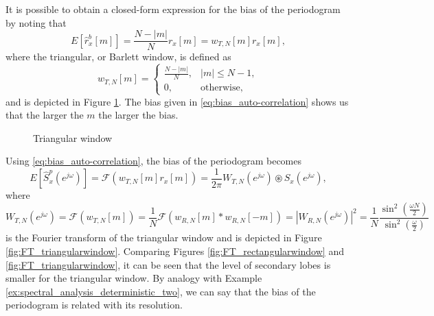 It is possible to obtain a closed-form expression for the bias of the periodogram by noting that
\begin{equation}
\label{eq:bias_auto-correlation}
E\left[\hat{r}_{x}^{b}[m]\right]  = \frac{N - |m|}{N} r_{x}[m] = w_{T,N}[m] r_{x}[m],
\end{equation}
where the triangular, or Barlett window, is defined as
\begin{equation}
w_{T,N}[m] = \begin{cases} \frac{N - |m|}{N}, & |m| \leq N-1, \\
0, & \text{otherwise},
\end{cases}
\end{equation}
and is depicted in Figure \ref{fig:triangularwindow}. The bias given in \eqref{eq:bias_auto-correlation} shows us that the larger the $m$ the larger the bias.
\begin{figure}
	\begin{center}
	\end{center}
	\caption{Triangular window}
	\label{fig:triangularwindow}
\end{figure}


Using \eqref{eq:bias_auto-correlation}, the bias of the periodogram becomes
\begin{equation}
\label{eq:bias_periodogram}
E\left[\hat{S}_x^{p}(e^{j \omega}) \right] = \mathcal{F}\left(w_{T,N}[m] r_{x}[m]\right) = \frac{1}{2 \pi} W_{T,N}(e^{j \omega}) \circledast S_x(e^{j \omega}),
\end{equation}
where
\begin{equation}
W_{T,N}(e^{j \omega}) = \mathcal{F}\left(w_{T,N}[m]\right) = \frac{1}{N} \mathcal{F}\left(w_{R,N}[m] \ast w_{R,N}[-m]\right) = |W_{R,N}(e^{j \omega})|^2 = \frac{1}{N} \frac{\sin^2\left(\frac{\omega N}{2}\right)}{\sin^2\left(\frac{\omega}{2}\right)}
\end{equation}
is the Fourier transform of the triangular window and is depicted in Figure \ref{fig:FT_triangularwindow}. Comparing Figures \ref{fig:FT_rectangularwindow} and \ref{fig:FT_triangularwindow}, it can be seen that the level of secondary lobes is smaller for the triangular window. By analogy with Example \ref{ex:spectral_analysis_deterministic_two}, we can say that the bias of the periodogram is related with its resolution.

